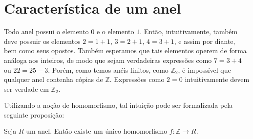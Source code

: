 \section{Característica de um anel}
Todo anel possui o elemento $0$ e o elemento $1$.
Então, intuitivamente, também deve possuir os elementos $2=1+1$, $3=2+1$, $4=3+1$, e assim por diante, bem como seus opostos.
Também esperamos que tais elementos operem de forma análoga aos inteiros, de modo que sejam verdadeiras expressões como $7=3+4$ ou $22=25-3$.
Porém, como temos anéis finitos, como $\mathbb Z_2$, é impossível que qualquer anel contenha cópias de $\mathbb Z$.
Expressões como $2=0$ intuitivamente devem ser verdade em $\mathbb Z_2$.

Utilizando a noção de homomorfismo, tal intuição pode ser formalizada pela seguinte proposição:

\begin{prop}
Seja $R$ um anel.
Então existe um único homomorfismo $f:\mathbb Z\rightarrow R$.
\end{prop}

